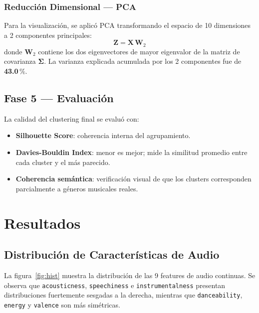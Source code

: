 \documentclass[12pt, a4paper]{article}
\begin{document}
\subsubsection{Reducción Dimensional — PCA}

Para la visualización, se aplicó PCA transformando el espacio de 10
dimensiones a 2 componentes principales:
\begin{equation}
\mathbf{Z} = \mathbf{X}\,\mathbf{W}_2
\end{equation}
donde $\mathbf{W}_2$ contiene los dos eigenvectores de mayor eigenvalor
de la matriz de covarianza $\boldsymbol{\Sigma}$. La varianza explicada
acumulada por los 2 componentes fue de \textbf{43.0}\,\%.

\subsection{Fase 5 — Evaluación}

La calidad del clustering final se evaluó con:
\begin{itemize}
  \item \textbf{Silhouette Score}: coherencia interna del agrupamiento.
  \item \textbf{Davies-Bouldin Index}: menor es mejor; mide la similitud
        promedio entre cada cluster y el más parecido.
  \item \textbf{Coherencia semántica}: verificación visual de que los
        clusters corresponden parcialmente a géneros musicales reales.
\end{itemize}

\section{Resultados}

\subsection{Distribución de Características de Audio}

La figura~\ref{fig:hist} muestra la distribución de las 9 features de audio
continuas. Se observa que \texttt{acousticness}, \texttt{speechiness} e
\texttt{instrumentalness} presentan distribuciones fuertemente sesgadas a
la derecha, mientras que \texttt{danceability}, \texttt{energy} y
\texttt{valence} son más simétricas.
\end{document}
